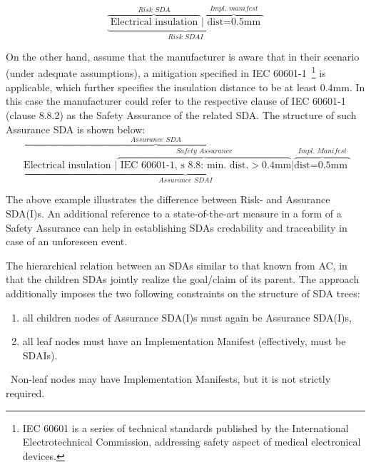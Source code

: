   \[
    \underbrace{
      \overbrace{\text{ Electrical insulation }}^{\textit{ Risk SDA }}
      |
      \overbrace{\text{ dist=0.5mm }}^{\textit{Impl. manifest}}
    }_\textit{Risk SDAI}
  \]

On the other hand, assume that the manufacturer is aware that in their scenario (under adequate assumptions), a mitigation specified in IEC 60601-1~\footnote{IEC 60601 is a series of technical standards published by the International Electrotechnical Commission, addressing safety aspect of medical electronical devices.} is applicable, which further specifies the insulation distance to be at least 0.4mm. In this case the manufacturer could refer to the respective clause of IEC 60601-1 (clause 8.8.2) as the Safety Assurance of the related SDA. The structure of such Assurance SDA is shown below:
\[
\underbrace{
    \overbrace{\text{ Electrical insulation }
    |
    \overbrace{\text{ IEC 60601-1, s 8.8: min. dist.}>0.4\text{mm}}^{\textit{Safety Assurance}}}^{\textit{Assurance SDA}}
    |
    \overbrace{\text{dist=0.5mm }}^{\textit{Impl. Manifest}}
}_\textit{Assurance  SDAI}
\]


The above example illustrates the difference between Risk- and Assurance SDA(I)s. An additional reference to a state-of-the-art measure in a form of a Safety Assurance can help in establishing SDAs credability and traceability in case of an unforeseen event.

The hierarchical relation between an SDAs similar to that known from AC, in that the children SDAs jointly realize the goal/claim of its parent.  
The \riskman approach additionally imposes the two following constraints on the structure of SDA trees: 
\begin{enumerate}
  \item all children nodes of Assurance SDA(I)s must again be Assurance SDA(I)s,
  \item all leaf nodes must have an Implementation Manifest (effectively, must be SDAIs).
\end{enumerate}

\noindent~Non-leaf nodes may have Implementation Manifests, but it is not strictly required. 
